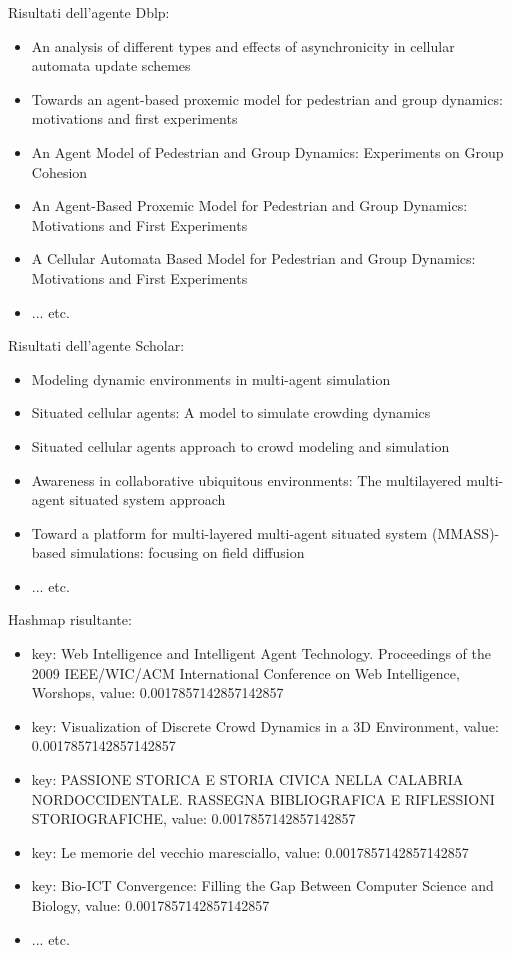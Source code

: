 \documentclass[12pt]{article}
\begin{document}
Risultati dell'agente Dblp:
\begin{itemize}
\item An analysis of different types and effects of asynchronicity in cellular automata update schemes
\item Towards an agent-based proxemic model for pedestrian and group dynamics: motivations and first experiments
\item An Agent Model of Pedestrian and Group Dynamics: Experiments on Group Cohesion
\item An Agent-Based Proxemic Model for Pedestrian and Group Dynamics: Motivations and First Experiments
\item A Cellular Automata Based Model for Pedestrian and Group Dynamics: Motivations and First Experiments
\item ... etc.
\end{itemize}
Risultati dell'agente Scholar:
\begin{itemize}
\item Modeling dynamic environments in multi-agent simulation
\item Situated cellular agents: A model to simulate crowding dynamics
\item Situated cellular agents approach to crowd modeling and simulation
\item Awareness in collaborative ubiquitous environments: The multilayered multi-agent situated system approach
\item Toward a platform for multi-layered multi-agent situated system (MMASS)-based simulations: focusing on field diffusion
\item ... etc.
\end{itemize}
Hashmap risultante:
\begin{itemize}
\item key: Web Intelligence and Intelligent Agent Technology. Proceedings of the 2009 IEEE/WIC/ACM International Conference on Web Intelligence, Worshops, value: 0.0017857142857142857
\item key: Visualization of Discrete Crowd Dynamics in a 3D Environment, value: 0.0017857142857142857
\item key: PASSIONE STORICA E STORIA CIVICA NELLA CALABRIA NORDOCCIDENTALE. RASSEGNA BIBLIOGRAFICA E RIFLESSIONI STORIOGRAFICHE, value: 0.0017857142857142857
\item key: Le memorie del vecchio maresciallo, value: 0.0017857142857142857
\item key: Bio-ICT Convergence: Filling the Gap Between Computer Science and Biology, value: 0.0017857142857142857
\item ... etc.
\end{itemize}
\end{document}
